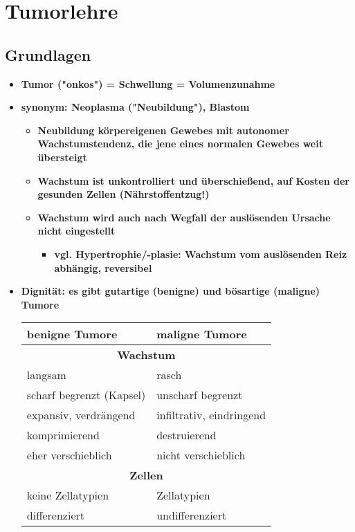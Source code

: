 \section{Tumorlehre}
	\subsection{Grundlagen}
		\begin{itemize}
			\item \textbf{Tumor ("onkos") = Schwellung = Volumenzunahme}
			\item \textbf{synonym: Neoplasma ("Neubildung"), Blastom}
				\begin{itemize}
					\item \textbf{Neubildung körpereigenen Gewebes mit autonomer Wachstumstendenz, die jene eines normalen Gewebes weit übersteigt}
					\item \textbf{Wachstum ist unkontrolliert und überschießend, auf Kosten der gesunden Zellen (Nährstoffentzug!)}
					\item \textbf{Wachstum wird auch nach Wegfall der auslösenden Ursache nicht eingestellt}
						\begin{itemize}
							\item \textbf{vgl. Hypertrophie/-plasie: Wachstum vom auslösenden Reiz abhängig, reversibel}
						\end{itemize}
				\end{itemize}
			\item \textbf{Dignität: es gibt gutartige (benigne) und bösartige (maligne) Tumore}
				\begin{center}
					\begin{tabular}{|ll|}
						\hline
						\textbf{benigne Tumore} & \textbf{maligne Tumore} \\
						\hline
						\multicolumn{2}{|c|}{\textbf{Wachstum}} \\ 
						langsam & rasch \\ 
						scharf begrenzt (Kapsel) & unscharf begrenzt \\ 
						expansiv, verdrängend & infiltrativ, eindringend \\
						komprimierend & destruierend \\
						eher verschieblich & nicht verschieblich \\
						\multicolumn{2}{|c|}{\textbf{Zellen}} \\
						keine Zellatypien & Zellatypien \\
						differenziert & undifferenziert \\

\end{tabular}
\end{center}
\end{itemize}
